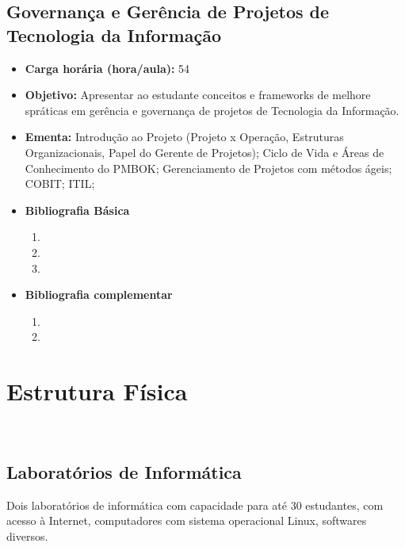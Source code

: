 \documentclass[11pt,fleqn]{book} %
\begin{document}
\section{Governança e Gerência de Projetos de Tecnologia da Informação}\label{6_govproj}
\begin{itemize}
	\item \textbf{Carga horária (hora/aula):} 54
	\item \textbf{Objetivo:} Apresentar ao estudante conceitos e frameworks de melhore spráticas em gerência e governança de projetos de Tecnologia da Informação.
	\item \textbf{Ementa:} 
	Introdução ao Projeto (Projeto x Operação, Estruturas Organizacionais, Papel do Gerente de Projetos);
	Ciclo de Vida e Áreas de Conhecimento do PMBOK;
	Gerenciamento de Projetos com métodos ágeis;
	COBIT;
	ITIL;
	\item \textbf{Bibliografia Básica}
	\begin{enumerate}
		\item 
		\item 
		\item 
	\end{enumerate}
	\item \textbf{Bibliografia complementar}
	\begin{enumerate}
		\item 
		\item
	\end{enumerate} 	
\end{itemize}

\chapter{Estrutura Física}\label{estrutura}
\vspace{6em}
\begin{flushright}
	\textit{\textcolor{white}{Um bonita citação...}}
\end{flushright}
\vspace{12em}

\section{Laboratórios de Informática}
Dois laboratórios de informática com capacidade para até 30 estudantes, com acesso à Internet, computadores com sistema operacional Linux, softwares diversos.
\end{document}
